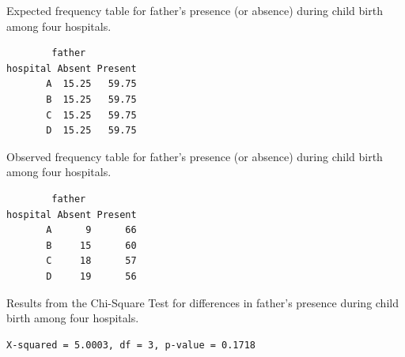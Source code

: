 \documentclass[10pt,openany]{book}\usepackage[]{graphicx}\usepackage[]{color}
\makeatletter
\newenvironment{kframe}{%
 \def\at@end@of@kframe{}%
 \ifinner\ifhmode%
  \def\at@end@of@kframe{\end{minipage}}%
  \begin{minipage}{\columnwidth}%
 \fi\fi%
 \def\FrameCommand##1{\hskip\@totalleftmargin \hskip-\fboxsep
 \colorbox{shadecolor}{##1}\hskip-\fboxsep
     \hskip-\linewidth \hskip-\@totalleftmargin \hskip\columnwidth}%
 \MakeFramed {\advance\hsize-\width
   \@totalleftmargin\z@ \linewidth\hsize
   \@setminipage}}%
 {\par\unskip\endMakeFramed%
 \at@end@of@kframe}
\newenvironment{knitrout}{}{} %
\makeatother
\begin{document}
\begin{table}[h]
  \caption{Expected frequency table for father's presence (or absence) during child birth among four hospitals.}
  \label{tab:ChiFPexp}
  \vspace{-12pt}
\begin{knitrout}
\color{fgcolor}\begin{kframe}
\begin{verbatim}
        father
hospital Absent Present
       A  15.25   59.75
       B  15.25   59.75
       C  15.25   59.75
       D  15.25   59.75
\end{verbatim}
\end{kframe}
\end{knitrout}
\end{table}

\begin{table}[h]
  \caption{Observed frequency table for father's presence (or absence) during child birth among four hospitals.}
  \label{tab:ChiFPobs}
  \vspace{-12pt}
\begin{knitrout}
\color{fgcolor}\begin{kframe}
\begin{verbatim}
        father
hospital Absent Present
       A      9      66
       B     15      60
       C     18      57
       D     19      56
\end{verbatim}
\end{kframe}
\end{knitrout}
\end{table}

\begin{table}[h]
  \caption{Results from the Chi-Square Test for differences in father's presence during child birth among four hospitals.}
  \label{tab:ChiFPchi}
  \vspace{-12pt}
\begin{knitrout}
\color{fgcolor}\begin{kframe}
\begin{verbatim}
X-squared = 5.0003, df = 3, p-value = 0.1718
\end{verbatim}
\end{kframe}
\end{knitrout}
\end{table}
\end{document}
